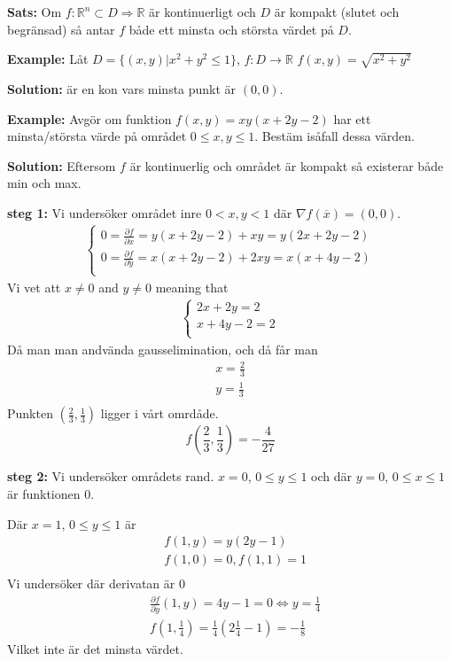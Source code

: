 \textbf{Sats:} Om $f:\mathbb{R}^n\subset D\Rightarrow\mathbb{R}$ är kontinuerligt
och $D$ är kompakt (slutet och begränsad) så antar $f$ både ett minsta och största 
värdet på $D$. 

\textbf{Example:} Låt $D=\{ (x,y)| x^2+y^2 \leq 1 \}$, $f: D\to\mathbb{R}$
$f(x,y)=\sqrt{x^2+y^2}$

\textbf{Solution:} är en kon vars minsta punkt är $(0,0)$.

\textbf{Example:} Avgör om funktion $f(x,y)=xy(x+2y-2)$ har ett minsta/största värde på området 
$0\leq x,y \leq 1$. Bestäm isåfall dessa värden.

\textbf{Solution:} Eftersom $f$ är kontinuerlig och området är kompakt så 
existerar både min och max. 

\textbf{steg 1:}
Vi undersöker området inre $0<x,y<1$ där $\nabla f(\overline{x})=(0,0)$.
\begin{align*}
    \begin{cases}
        0 = \frac{\partial f}{\partial x} = y(x+2y-2) +xy = y(2x+2y-2) \\
        0 = \frac{\partial f}{\partial y} = x(x+2y-2) +2xy = x(x+4y-2) \\
    \end{cases}
\end{align*}
Vi vet att $x\neq0$ and $y\neq0$ meaning that 
\begin{align*}
    \begin{cases}
        2x+2y = 2 \\
        x+4y-2 = 2 \\
    \end{cases}
\end{align*}
Då man man andvända gausselimination, och då får man
\begin{align*}
    x = \frac{2}{3} \\
    y = \frac{1}{3} \\
\end{align*}
Punkten $(\frac{2}{3}, \frac{1}{3})$ ligger i vårt omrdåde.
\begin{equation*}
    f\left(\frac{2}{3}, \frac{1}{3}\right) = -\frac{4}{27}
\end{equation*}

\textbf{steg 2:}
Vi undersöker områdets rand.
$x=0$, $0\leq y \leq1$ och där $y=0$, $0\leq x \leq1$ är funktionen $0$.

Där $x=1$, $0\leq y \leq1$ är
\begin{align*}
    &f(1,y) = y(2y-1) \\
    &f(1,0) = 0, f(1,1) =1 \\
\end{align*}
Vi undersöker där derivatan är $0$
\begin{align*}
    &\frac{\partial f}{\partial y}(1,y) = 4y-1 = 0 \Leftrightarrow y = \frac{1}{4} \\
    &f\left(1,\frac{1}{4}\right) = \frac{1}{4}\left(2\frac{1}{4} - 1\right) = -\frac{1}{8} 
\end{align*}
Vilket inte är det minsta värdet.

